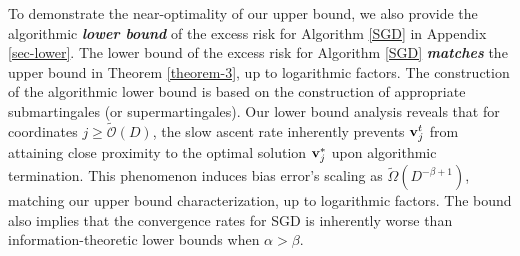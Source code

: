 \begin{remark}
    To demonstrate the near-optimality of our upper bound, we also provide the algorithmic {\bf \emph{lower bound}} of the excess risk for Algorithm \ref{SGD} in Appendix \ref{sec-lower}. The lower bound of the excess risk for Algorithm \ref{SGD} {\bf \emph{matches}} the upper bound in Theorem \ref{theorem-3},  up to logarithmic factors. 
    The construction of the algorithmic lower bound is based on the construction of appropriate submartingales (or supermartingales). 
    Our lower bound analysis reveals that for coordinates $j\geq\widetilde{\mathcal{O}}(D)$, the slow ascent rate inherently prevents $\mathbf{v}_j^t$ from attaining close proximity to the optimal solution $\mathbf{v}_j^*$ upon algorithmic termination. This phenomenon induces bias error's scaling as $\widetilde{\Omega}(D^{-\beta+1})$, matching our upper bound characterization, up to logarithmic factors. The bound also implies that the convergence rates for SGD is inherently worse than  information-theoretic lower bounds when $\alpha >\beta$. %
\end{remark}


